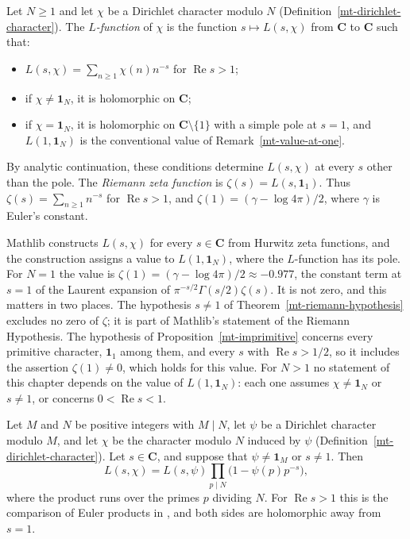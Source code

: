 \begin{definition}\label{mt-l-function}
Let $N\geq1$ and let $\chi$ be a Dirichlet character modulo $N$
(Definition~\ref{mt-dirichlet-character}). The \emph{$L$-function} of $\chi$ is the function
$s\mapsto L(s,\chi)$ from $\mathbf C$ to $\mathbf C$ such that:
\begin{itemize}
\item $L(s,\chi)=\sum_{n\geq1}\chi(n)n^{-s}$ for $\operatorname{Re}s>1$;
\item if $\chi\neq\mathbf 1_N$, it is holomorphic on $\mathbf C$;
\item if $\chi=\mathbf 1_N$, it is holomorphic on $\mathbf C\setminus\{1\}$ with a simple pole at
  $s=1$, and $L(1,\mathbf 1_N)$ is the conventional value of Remark~\ref{mt-value-at-one}.
\end{itemize}
By analytic continuation, these conditions determine $L(s,\chi)$ at every $s$ other than the
pole. The \emph{Riemann zeta function} is $\zeta(s)=L(s,\mathbf 1_1)$. Thus
$\zeta(s)=\sum_{n\geq1}n^{-s}$ for $\operatorname{Re}s>1$, and $\zeta(1)=(\gamma-\log4\pi)/2$,
where $\gamma$ is Euler's constant.
\end{definition}

\begin{remark}\label{mt-value-at-one}
Mathlib constructs $L(s,\chi)$ for every $s\in\mathbf C$ from Hurwitz zeta functions, and the
construction assigns a value to $L(1,\mathbf 1_N)$, where the $L$-function has its pole. For $N=1$
the value is $\zeta(1)=(\gamma-\log4\pi)/2\approx-0.977$, the constant term at $s=1$ of the
Laurent expansion of $\pi^{-s/2}\Gamma(s/2)\zeta(s)$. It is not zero, and this matters in two places.
The hypothesis $s\neq1$ of Theorem~\ref{mt-riemann-hypothesis} excludes no zero of
$\zeta$; it is part of Mathlib's statement of the Riemann Hypothesis. The hypothesis of
Proposition~\ref{mt-imprimitive} concerns every primitive character, $\mathbf 1_1$ among them, and
every $s$ with $\operatorname{Re}s>1/2$, so it includes the assertion $\zeta(1)\neq0$, which holds
for this value. For $N>1$ no statement of this chapter depends on the value of
$L(1,\mathbf 1_N)$: each one assumes $\chi\neq\mathbf 1_N$ or $s\neq1$, or concerns
$0<\operatorname{Re}s<1$.
\end{remark}

\begin{lemma}\label{mt-euler-factors}
Let $M$ and $N$ be positive integers with $M\mid N$, let $\psi$ be a Dirichlet character modulo
$M$, and let $\chi$ be the character modulo $N$ induced by $\psi$
(Definition~\ref{mt-dirichlet-character}). Let $s\in\mathbf C$, and suppose that
$\psi\neq\mathbf 1_M$ or $s\neq1$. Then
\[
 L(s,\chi)=L(s,\psi)\prod_{p\mid N}\bigl(1-\psi(p)p^{-s}\bigr),
\]
where the product runs over the primes $p$ dividing $N$. For $\operatorname{Re}s>1$ this is the
comparison of Euler products in \cite[Chapter 5]{Dav00}, and both sides are holomorphic away from
$s=1$.
\end{lemma}

